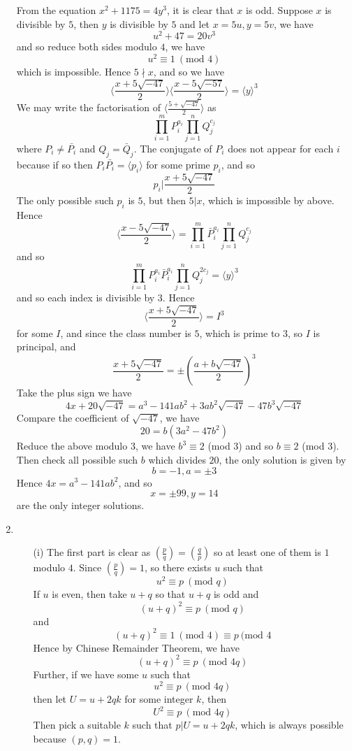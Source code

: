 \begin{enumerate}
From the equation $x^2+1175=4y^3$, it is clear that $x$ is odd. Suppose $x$ is divisible by $5$, then $y$ is divisible by $5$ and let $x=5u,y=5v$, we have
$$u^2+47=20v^3$$
and so reduce both sides modulo $4$, we have
$$u^2 \equiv 1~(\text{mod } 4)$$
which is impossible.
Hence $5 \nmid x$, and so we have
$$\langle \frac{x+5\sqrt{-47}}{2} \rangle \langle \frac{x-5\sqrt{-57}}{2}\rangle=\langle y \rangle^3$$
We may write the factorisation of $\langle \frac{5+\sqrt{-47}}{2} \rangle$ as
$$\prod_{i=1}^m P^{a_i}_i \prod_{j=1}^n Q^{c_j}_j$$
where $P_i \neq \bar{P_i}$ and $Q_j=\bar{Q}_j$. The conjugate of $P_i$ does not appear for each $i$ because if
so then $P_i\bar{P_i}=\langle p_i \rangle$ for some prime $p_i$, and so
$$p_i \big|\frac{x+5\sqrt{-47}}{2}$$
The only possible such $p_i$ is $5$, but then $5|x$, which is impossible by above. Hence
$$\langle \frac{x-5\sqrt{-47}}{2} \rangle =\prod_{i=1}^m \bar{P}^{a_i}_i \prod_{j=1}^n Q^{c_j}_j$$
and so
$$\prod_{i=1}^m P^{a_i}_i \bar{P}^{a_i}_i \prod_{j=1}^n Q^{2c_j}_j =\langle y \rangle^3$$
and so each index is divisible by $3$. Hence
$$\langle \frac{x+5\sqrt{-47}}{2} \rangle=I^3$$
for some $I$, and since the class number is $5$, which is prime to $3$, so $I$ is principal, and
$$\frac{x+5\sqrt{-47}}{2} =\pm \left(\frac{a+b\sqrt{-47}}{2}\right)^3$$
Take the plus sign we have
$$4x+20\sqrt{-47}=a^3-141ab^2+3ab^2\sqrt{-47}-47b^3\sqrt{-47}$$
Compare the coefficient of $\sqrt{-47}$, we have
$$20=b(3a^2-47b^2)$$
Reduce the above modulo $3$, we have $b^3 \equiv 2$ (mod $3$) and so
$b \equiv 2$ (mod $3$). Then check all possible such $b$ which divides $20$,
the only solution is given by
$$b=-1,a=\pm 3$$
Hence $4x=a^3-141ab^2$, and so
$$x=\pm 99,y=14$$
are the only integer solutions.
\item
\begin{enumerate}
\item[(i)] The first part is clear as $(\frac{p}{q})=(\frac{q}{p})$ so at least one of them is $1$ modulo $4$. Since $(\frac{p}{q})=1$, so there exists $u$ such that
    $$u^2 \equiv p~(\text{mod } q)$$
    If $u$ is even, then take $u+q$ so that $u+q$ is odd and
    $$(u+q)^2 \equiv p~(\text{mod } q)$$
    and
    $$(u+q)^2 \equiv 1~(\text{mod } 4) \equiv p~(\text{mod } 4$$
    Hence by Chinese Remainder Theorem, we have
    $$(u+q)^2 \equiv p~(\text{mod }4q)$$
    Further, if we have some $u$ such that
    $$u^2 \equiv p~(\text{mod }4q)$$
    then let $U=u+2qk$ for some integer $k$, then
    $$U^2 \equiv p~(\text{mod }4q)$$
    Then pick a suitable $k$ such that $p|U=u+2qk$, which is always possible because $(p,q)=1$.

\end{enumerate}
\end{enumerate}
